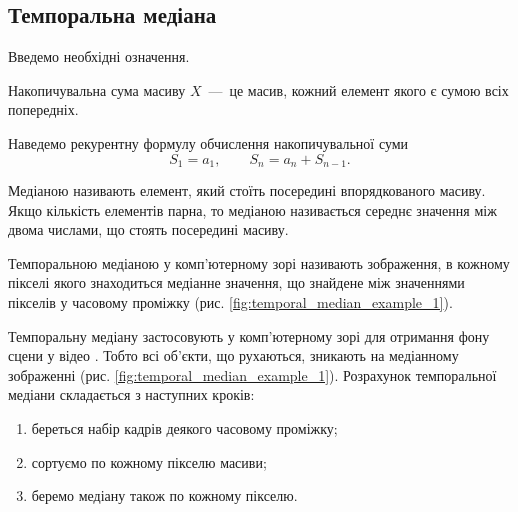 \subsection{Темпоральна медіана}

Введемо необхідні означення.

\begin{definition}
    Накопичувальна сума масиву \cite{integral_image} $X$~---~це масив, кожний елемент якого є сумою всіх попередніх.
\end{definition}

Наведемо рекурентну формулу обчислення накопичувальної суми
\begin{equation}
    S_1 = a_1, \qquad S_n = a_n + S_{n-1}.
    \label{eq:summed_table_formula}
\end{equation}

\begin{definition}
    Медіаною \cite{median_in_statistics} називають елемент, який стоїть посередині впорядкованого масиву.
    Якщо кількість елементів парна, то медіаною називається середнє значення між двома числами,
    що стоять посередині масиву.
\end{definition}

\begin{definition}
    Темпоральною медіаною у комп'ютерному зорі називають зображення,
    в кожному пікселі якого знаходиться медіанне значення, що знайдене між значеннями пікселів у часовому проміжку
    (рис. \ref{fig:temporal_median_example_1}).
\end{definition}

Темпоральну медіану застосовують у комп'ютерному зорі для отримання
фону сцени у відео \cite{temporal_median_example_1}.
Тобто всі об'єкти, що рухаються, зникають на медіанному зображенні
(рис. \ref{fig:temporal_median_example_1}).
Розрахунок темпоральної медіани складається з наступних кроків:
\begin{enumerate}
    \item береться набір кадрів деякого часовому проміжку;
    \item сортуємо по кожному пікселю масиви;
    \item беремо медіану також по кожному пікселю.
\end{enumerate}

